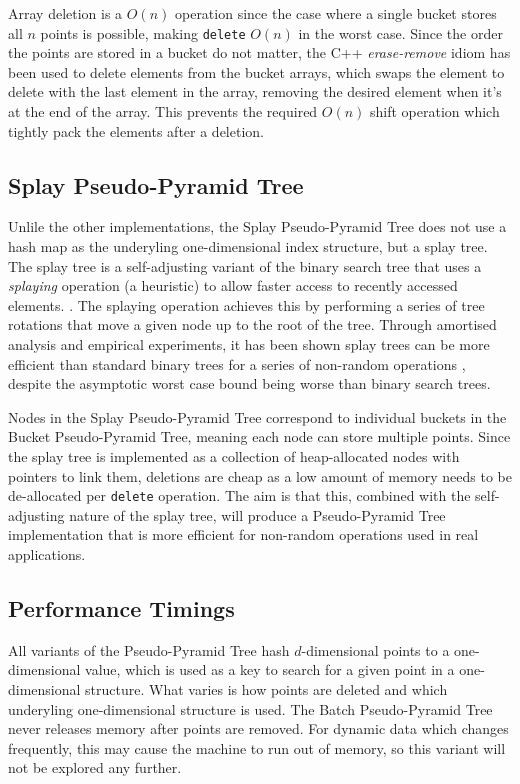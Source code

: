 Array deletion is a $O(n)$ operation since the case where a single bucket stores all $n$ points is possible, making \texttt{delete} $O(n)$ in the worst case. Since the order the points are stored in a bucket do not matter, the C++ \textit{erase-remove} idiom has been used to delete elements from the bucket arrays, which swaps the element to delete with the last element in the array, removing the desired element when it's at the end of the array. This prevents the required $O(n)$ shift operation which tightly pack the elements after a deletion.

\subsection{Splay Pseudo-Pyramid Tree}

Unlile the other implementations, the Splay Pseudo-Pyramid Tree does not use a hash map as the underyling one-dimensional index structure, but a splay tree. The splay tree is a self-adjusting variant of the binary search tree that uses a \textit{splaying} operation (a heuristic) to allow faster access to recently accessed elements. \cite{splay-tree}. The splaying operation achieves this by performing a series of tree rotations that move a given node up to the root of the tree. Through amortised analysis and empirical experiments, it has been shown splay trees can be more efficient than standard binary trees for a series of non-random operations \cite{splay-tree}, despite the asymptotic worst case bound being worse than binary search trees.

Nodes in the Splay Pseudo-Pyramid Tree correspond to individual buckets in the Bucket Pseudo-Pyramid Tree, meaning each node can store multiple points. Since the splay tree is implemented as a collection of heap-allocated nodes with pointers to link them, deletions are cheap as a low amount of memory needs to be de-allocated per \texttt{delete} operation. The aim is that this, combined with the self-adjusting nature of the splay tree, will produce a Pseudo-Pyramid Tree implementation that is more efficient for non-random operations used in real applications.

\subsection{Performance Timings}

All variants of the Pseudo-Pyramid Tree hash $d$-dimensional points to a one-dimensional value, which is used as a key to search for a given point in a one-dimensional structure. What varies is how points are deleted and which underyling one-dimensional structure is used. The Batch Pseudo-Pyramid Tree never releases memory after points are removed. For dynamic data which changes frequently, this may cause the machine to run out of memory, so this variant will not be explored any further.

